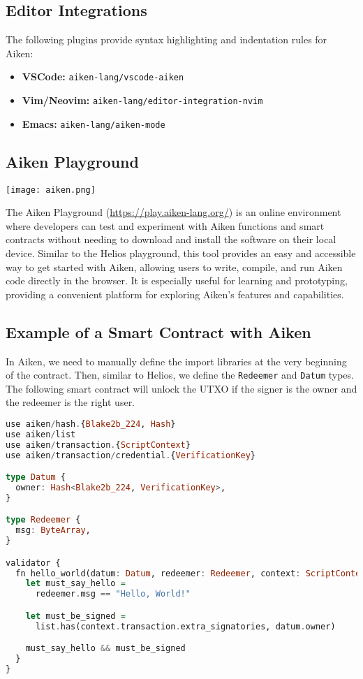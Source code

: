 \subsection{Editor Integrations}
The following plugins provide syntax highlighting and indentation rules for Aiken:
\begin{itemize}
  \item \textbf{VSCode:} \verb|aiken-lang/vscode-aiken|
  \item \textbf{Vim/Neovim:} \verb|aiken-lang/editor-integration-nvim|
  \item \textbf{Emacs:} \verb|aiken-lang/aiken-mode|
\end{itemize}

\subsection{Aiken Playground}

\texttt{[image: aiken.png]}

The Aiken Playground (\url{https://play.aiken-lang.org/}) is an online environment where developers can test and experiment with Aiken functions and smart contracts without needing to download and install the software on their local device. Similar to the Helios playground, this tool provides an easy and accessible way to get started with Aiken, allowing users to write, compile, and run Aiken code directly in the browser. It is especially useful for learning and prototyping, providing a convenient platform for exploring Aiken's features and capabilities.


\subsection{Example of a Smart Contract with Aiken}

In Aiken, we need to manually define the import libraries at the very beginning of the contract. Then, similar to Helios, we define the \texttt{Redeemer} and \texttt{Datum} types. The following smart contract will unlock the UTXO if the signer is the owner and the redeemer is the right user.

\begin{lstlisting}[language=Haskell]
use aiken/hash.{Blake2b_224, Hash}
use aiken/list
use aiken/transaction.{ScriptContext}
use aiken/transaction/credential.{VerificationKey}

type Datum {
  owner: Hash<Blake2b_224, VerificationKey>,
}

type Redeemer {
  msg: ByteArray,
}

validator {
  fn hello_world(datum: Datum, redeemer: Redeemer, context: ScriptContext) -> Bool {
    let must_say_hello =
      redeemer.msg == "Hello, World!"

    let must_be_signed =
      list.has(context.transaction.extra_signatories, datum.owner)

    must_say_hello && must_be_signed
  }
}
\end{lstlisting}


